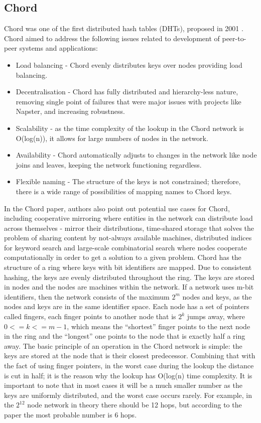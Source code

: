 \subsection{Chord}
Chord was one of the first distributed hash tables (DHTs), proposed in 2001 \cite{chord}. Chord aimed to address the following issues related to development of peer-to-peer systems and applications:
\begin{itemize}
    \item Load balancing - Chord evenly distributes keys over nodes providing load balancing.
    \item Decentralisation - Chord has fully distributed and hierarchy-less nature, removing single point of failures that were major issues with projects like Napster, and increasing robustness.
    \item Scalability - as the time complexity of the lookup in the Chord network is O(log(n)), it allows for large numbers of nodes in the network.
    \item Availability - Chord automatically adjusts to changes in the network like node joins and leaves, keeping the network functioning regardless.
    \item Flexible naming - The structure of the keys is not constrained; therefore, there is a wide range of possibilities of mapping names to Chord keys.
\end{itemize}
In the Chord paper, authors also point out potential use cases for Chord, including cooperative mirroring where entities in the network can distribute load across themselves - mirror their distributions, time-shared storage that solves the problem of sharing content by not-always available machines, distributed indices for keyword search and large-scale combinatorial search where nodes cooperate computationally in order to get a solution to a given problem.
Chord has the structure of a ring where keys with bit identifiers are mapped. Due to consistent hashing, the keys are evenly distributed throughout the ring. The keys are stored in nodes and the nodes are machines within the network. If a network uses m-bit identifiers, then the network consists of the maximum $2^m$ nodes and keys, as the nodes and keys are in the same identifier space. Each node has a set of pointers called fingers, each finger points to another node that is $2^k$ jumps away, where $0 <= k <= m-1$, which means the “shortest” finger points to the next node in the ring and the “longest” one points to the node that is exactly half a ring away. The basic principle of an operation in the Chord network is simple: the keys are stored at the node that is their closest predecessor. Combining that with the fact of using finger pointers, in the worst case during the lookup the distance is cut in half; it is the reason why the lookup has O(log(n) time complexity. It is important to note that in most cases it will be a much smaller number as the keys are uniformly distributed, and the worst case occurs rarely. For example, in the $2^12$ node network in theory there should be 12 hops, but according to the paper the most probable number is 6 hops.

